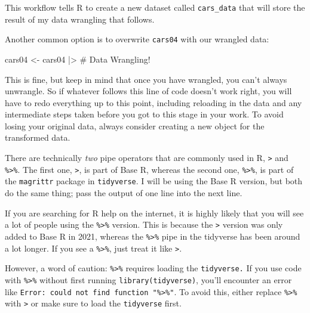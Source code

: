 \documentclass[
  letterpaper,
]{book}
\newenvironment{Shaded}{\begin{snugshade}}{\end{snugshade}}
\newcommand{\CommentTok}[1]{\textcolor[rgb]{0.37,0.37,0.37}{#1}}
\newcommand{\NormalTok}[1]{\textcolor[rgb]{0.00,0.23,0.31}{#1}}
\newcommand{\OtherTok}[1]{\textcolor[rgb]{0.00,0.23,0.31}{#1}}
\newcommand{\SpecialCharTok}[1]{\textcolor[rgb]{0.37,0.37,0.37}{#1}}
\begin{document}
This workflow tells R to create a new dataset called \texttt{cars\_data}
that will store the result of my data wrangling that follows.

Another common option is to overwrite \texttt{cars04} with our wrangled
data:

\begin{Shaded}
\begin{Highlighting}[]
\NormalTok{cars04 }\OtherTok{\textless{}{-}}\NormalTok{ cars04 }\SpecialCharTok{|\textgreater{}} 
  \CommentTok{\# Data Wrangling! }
\end{Highlighting}
\end{Shaded}

This is fine, but keep in mind that once you have wrangled, you can't
always unwrangle. So if whatever follows this line of code doesn't work
right, you will have to redo everything up to this point, including
reloading in the data and any intermediate steps taken before you got to
this stage in your work. To avoid losing your original data, always
consider creating a new object for the transformed data.

\begin{tcolorbox}[enhanced jigsaw, colframe=quarto-callout-tip-color-frame, breakable, arc=.35mm, bottomtitle=1mm, bottomrule=.15mm, colbacktitle=quarto-callout-tip-color!10!white, rightrule=.15mm, colback=white, opacityback=0, opacitybacktitle=0.6, coltitle=black, left=2mm, toptitle=1mm, toprule=.15mm, titlerule=0mm, leftrule=.75mm, title=\textcolor{quarto-callout-tip-color}{\faLightbulb}\hspace{0.5em}{Tip from the Helpdesk: A Tale of Two Pipes}]

There are technically \emph{two} pipe operators that are commonly used
in R, \texttt{\textbar{}\textgreater{}} and \texttt{\%\textgreater{}\%}.
The first one, \texttt{\textbar{}\textgreater{}}, is part of Base R,
whereas the second one, \texttt{\%\textgreater{}\%}, is part of the
\texttt{magrittr} package in \texttt{tidyverse}. I will be using the
Base R version, but both do the same thing; pass the output of one line
into the next line.

If you are searching for R help on the internet, it is highly likely
that you will see a lot of people using the \texttt{\%\textgreater{}\%}
version. This is because the \texttt{\textbar{}\textgreater{}} version
was only added to Base R in 2021, whereas the
\texttt{\%\textgreater{}\%} pipe in the tidyverse has been around a lot
longer. If you see a \texttt{\%\textgreater{}\%}, just treat it like
\texttt{\textbar{}\textgreater{}}.

However, a word of caution: \texttt{\%\textgreater{}\%} requires loading
the \texttt{tidyverse.} If you use code with \texttt{\%\textgreater{}\%}
without first running \texttt{library(tidyverse)}, you'll encounter an
error like
\texttt{Error:\ could\ not\ find\ function\ "\%\textgreater{}\%"}. To
avoid this, either replace \texttt{\%\textgreater{}\%} with
\texttt{\textbar{}\textgreater{}} or make sure to load the
\texttt{tidyverse} first.

\end{tcolorbox}
\end{document}
